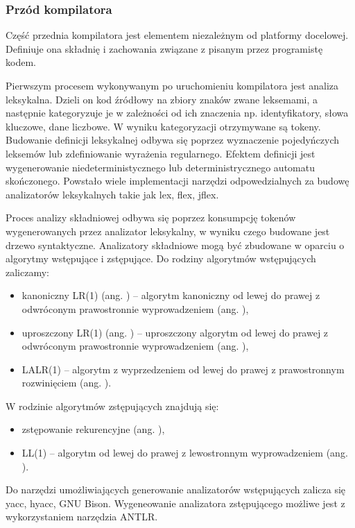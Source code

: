 \subsubsection{Przód kompilatora}
Część przednia kompilatora jest elementem niezależnym od platformy docelowej. Definiuje ona składnię i zachowania związane z pisanym przez programistę kodem.

Pierwszym procesem wykonywanym po uruchomieniu kompilatora jest analiza leksykalna. Dzieli on kod źródłowy na zbiory znaków zwane leksemami, a następnie kategoryzuje je w zależności od ich znaczenia np. identyfikatory, słowa kluczowe, dane liczbowe. W wyniku kategoryzacji otrzymywane są tokeny. Budowanie definicji leksykalnej odbywa się poprzez wyznaczenie pojedyńczych leksemów lub zdefiniowanie wyrażenia regularnego. Efektem definicji jest wygenerowanie niedeterministycznego lub deterministrycznego automatu skończonego. Powstało wiele implementacji narzędzi odpowedzialnych za budowę analizatorów leksykalnych takie jak lex, flex, jflex.

Proces analizy składniowej odbywa się poprzez konsumpcję tokenów wygenerowanych przez analizator leksykalny, w wyniku czego budowane jest drzewo syntaktyczne. Analizatory składniowe mogą być zbudowane w oparciu o algorytmy wstępujące i zstępujące. Do rodziny algorytmów wstępujących zaliczamy:
\begin{itemize}
\item kanoniczny LR(1) (ang. ) -- algorytm kanoniczny od lewej do prawej z odwróconym prawostronnie wyprowadzeniem (ang. ),
\item uproszczony LR(1) (ang. ) -- uproszczony algorytm od lewej do prawej z odwróconym prawostronnie wyprowadzeniem (ang. ),
\item LALR(1) -- algorytm z wyprzedzeniem od lewej do prawej z prawostronnym rozwinięciem (ang. ).
\end{itemize}
W rodzinie algorytmów zstępujących znajdują się:
\begin{itemize}
\item zstępowanie rekurencyjne (ang. ),
\item LL(1) -- algorytm od lewej do prawej z lewostronnym wyprowadzeniem (ang. ).
\end{itemize}
Do narzędzi umożliwiających generowanie analizatorów wstępujących zalicza się yacc, hyacc, GNU Bison. Wygeneowanie analizatora zstępującego możliwe jest z wykorzystaniem narzędzia ANTLR.

